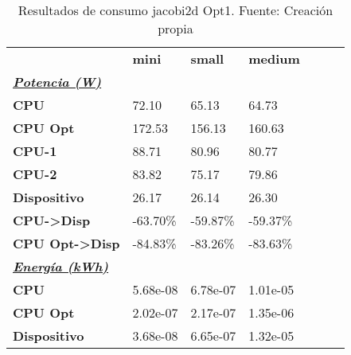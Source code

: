 \begin{table}[H]
    \centering
    \begin{tabular}{lllllll}
    \rowcolor[HTML]{DAE8FC} \ & \textbf{mini} & \textbf{	small} & \textbf{	medium} \\
    \cellcolor[HTML]{DAE8FC} \textbf{\textbf{{\emph{{\underline{{Potencia (W)}}}}}}} &  & 	 & 	 \\
    \rowcolor[HTML]{EFEFEF} \cellcolor[HTML]{DAE8FC} \textbf{CPU} & 72.10 & 	65.13 & 	64.73 \\
    \cellcolor[HTML]{DAE8FC} \textbf{CPU Opt} & 172.53 & 	156.13 & 	160.63 \\
    \rowcolor[HTML]{EFEFEF} \cellcolor[HTML]{DAE8FC} \textbf{\quad CPU-1} & 88.71 & 	80.96 & 	80.77 \\
    \cellcolor[HTML]{DAE8FC} \textbf{\quad CPU-2} & 83.82 & 	75.17 & 	79.86 \\
    \rowcolor[HTML]{EFEFEF} \cellcolor[HTML]{DAE8FC} \textbf{Dispositivo} & 26.17 & 	26.14 & 	26.30 \\
    \cellcolor[HTML]{DAE8FC} \textbf{CPU->Disp} & -63.70\% & 	-59.87\% & 	-59.37\% \\
    \rowcolor[HTML]{EFEFEF} \cellcolor[HTML]{DAE8FC} \textbf{CPU Opt->Disp} & -84.83\% & 	-83.26\% & 	-83.63\% \\
    \cellcolor[HTML]{DAE8FC} \textbf{\textbf{{\emph{{\underline{{Energía (kWh)}}}}}}} &  & 	 & 	 \\
    \rowcolor[HTML]{EFEFEF} \cellcolor[HTML]{DAE8FC} \textbf{CPU} & 5.68e-08 & 	6.78e-07 & 	1.01e-05 \\
    \cellcolor[HTML]{DAE8FC} \textbf{CPU Opt} & 2.02e-07 & 	2.17e-07 & 	1.35e-06 \\
    \rowcolor[HTML]{EFEFEF} \cellcolor[HTML]{DAE8FC} \textbf{Dispositivo} & 3.68e-08 & 	6.65e-07 & 	1.32e-05 \\
    \end{tabular}
    \caption[Resultados de consumo jacobi2d Opt1]{{Resultados de consumo jacobi2d Opt1. Fuente: Creación propia}}
    \label{table_test_jacobi2d_Opt1_hw_powerResults}
\end{table}